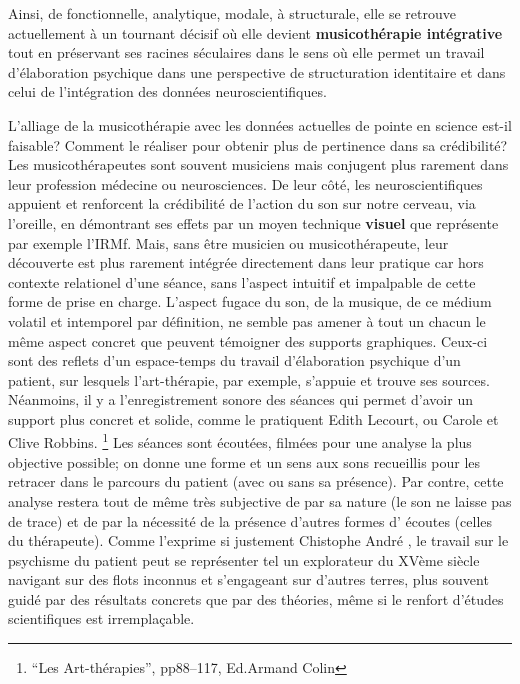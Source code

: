  Ainsi, de fonctionnelle, analytique, mo\-da\-le,  à 
struc\-tu\-rale, elle se retrouve actuellement 
 à un tournant décisif où elle devient 
 \textbf{ musicothérapie intégrative} tout en préservant ses racines
 séculaires dans le sens où elle permet un travail d'élaboration psychique dans une perspective de structuration identitaire \autocite[ch. III, p. 53, 
105]{vrait_musicotherapie_2018} et dans celui de l'intégration des données 
neuroscientifiques.
 


 


L'alliage de la musicothérapie avec les données actuelles de pointe en
science est-il faisable? Comment le réaliser pour obtenir plus de pertinence
dans sa crédibilité?
Les musicothérapeutes sont souvent musiciens mais conjugent plus
rarement dans leur profession
médecine ou neurosciences. De leur côté, les neuroscientifiques appuient
et renforcent la crédibilité de l'action du son sur notre cerveau, via
l'oreille, en démontrant ses effets par un moyen technique
\textbf{visuel} que représente par exemple l'IRMf. Mais, sans être musicien ou
musicothérapeute, leur découverte est plus rarement intégrée
directement dans leur pratique car hors contexte relationel d'une
séance, sans l'aspect intuitif et impalpable de cette forme de prise
en charge.
L'aspect fugace du son, de la musique, de ce médium volatil et
intemporel par
définition, ne semble pas amener à tout un chacun le
même aspect concret que peuvent témoigner des supports
graphiques. Ceux-ci sont des 
reflets d'un espace-temps du travail d'élaboration
psychique d'un patient, sur lesquels l'art-thérapie, par exemple, s'appuie et trouve
ses sources.
Néanmoins, il y a l'enregistrement sonore des séances qui 
permet d'avoir un support plus concret et solide, comme le pratiquent Edith Lecourt, ou Carole et Clive 
Robbins. \footnote{``Les Art-thérapies'', pp88--117, Ed.Armand Colin}
Les séances sont écoutées, filmées pour une
analyse la plus objective possible; on donne 
une forme et un sens aux sons recueillis pour les retracer dans le
parcours du patient (avec ou sans sa présence). Par contre, cette analyse  restera
tout de même très subjective de par sa nature (le son ne laisse pas
de trace) et de par la nécessité de la présence d'autres formes d'
écoutes (celles du thérapeute).
Comme l'exprime si justement Chistophe André \autocite[154]{van_eersel_cerveau}, le travail sur le psychisme du patient peut se  représenter tel un
explorateur du XVème siècle navigant sur des flots inconnus et
s'engageant sur d'autres terres, plus souvent guidé par des résultats
concrets que par des théories, même si le renfort d'études
scientifiques est irremplaçable.

